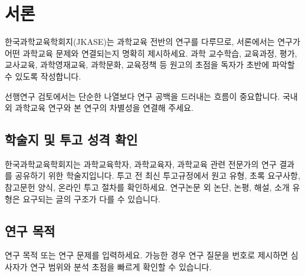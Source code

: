 \section{서론}

한국과학교육학회지(JKASE)는 과학교육 전반의 연구를 다루므로, 서론에서는 연구가 어떤 과학교육 문제와 연결되는지 명확히 제시하세요. 과학 교수학습, 교육과정, 평가, 교사교육, 과학영재교육, 과학문화, 교육정책 등 원고의 초점을 독자가 초반에 파악할 수 있도록 작성합니다.

선행연구 검토에서는 단순한 나열보다 연구 공백을 드러내는 흐름이 중요합니다. 국내외 과학교육 연구와 본 연구의 차별성을 연결해 주세요.

\subsection{학술지 및 투고 성격 확인}

한국과학교육학회지는 과학교육학자, 과학교육자, 과학교육 관련 전문가의 연구 결과를 공유하기 위한 학술지입니다. 투고 전 최신 투고규정에서 원고 유형, 초록 요구사항, 참고문헌 양식, 온라인 투고 절차를 확인하세요. 연구논문 외 논단, 논평, 해설, 소개 유형은 요구되는 글의 구조가 다를 수 있습니다.

\subsection{연구 목적}

연구 목적 또는 연구 문제를 입력하세요. 가능한 경우 연구 질문을 번호로 제시하면 심사자가 연구 범위와 분석 초점을 빠르게 확인할 수 있습니다.
